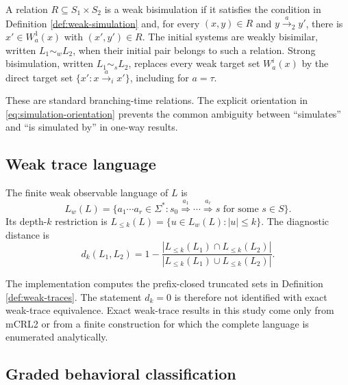 \documentclass{ws-jbcb}
\numberwithin{equation}{section}
\newcommand{\TAU}{\tau}
\newcommand{\xRightarrow}[1]{\stackrel{#1}{\Longrightarrow}}
\newcommand{\strongsim}{\mathrel{\sim_{s}}}
\newcommand{\weaksim}{\mathrel{\sim_{w}}}
\begin{document}
\begin{definition}\label{def:bisimulation}
A relation $R\subseteq S_1\times S_2$ is a weak bisimulation if it satisfies the
condition in Definition \ref{def:weak-simulation} and, for every $(x,y)\in R$ and
$y\xrightarrow{a}_2y'$, there is $x'\in W_a^1(x)$ with $(x',y')\in R$. The
initial systems are weakly bisimilar, written $L_1\weaksim L_2$, when their
initial pair belongs to such a relation. Strong bisimulation, written
$L_1\strongsim L_2$, replaces every weak target set $W_a^i(x)$ by the direct
target set $\{x':x\xrightarrow{a}_i x'\}$, including for $a=\TAU$.
\end{definition}

These are standard branching-time relations.\cite{Milner1989,Sangiorgi2011}
The explicit orientation in \eqref{eq:simulation-orientation} prevents the common
ambiguity between ``simulates'' and ``is simulated by'' in one-way results.

\subsection{Weak trace language}\label{sec:trace-language}

\begin{definition}\label{def:weak-traces}
The finite weak observable language of $L$ is
\begin{equation}\label{eq:exact-language}
 L_w(L)=\{a_1\cdots a_r\in\Sigma^*:s_0
 \xRightarrow{a_1}\cdots\xRightarrow{a_r}s
 \text{ for some }s\in S\}.
\end{equation}
Its depth-$k$ restriction is
$L_{\leq k}(L)=\{u\in L_w(L):|u|\leq k\}$. The diagnostic distance is
\begin{equation}\label{eq:distance}
d_k(L_1,L_2)=1-
\frac{|L_{\leq k}(L_1)\cap L_{\leq k}(L_2)|}
{|L_{\leq k}(L_1)\cup L_{\leq k}(L_2)|}.
\end{equation}
\end{definition}

The implementation computes the prefix-closed truncated sets in Definition
\ref{def:weak-traces}. The statement $d_k=0$ is therefore not identified with
exact weak-trace equivalence. Exact weak-trace results in this study come only
from mCRL2 or from a finite construction for which the complete language is
enumerated analytically.

\subsection{Graded behavioral classification}\label{sec:decision}
\end{document}
